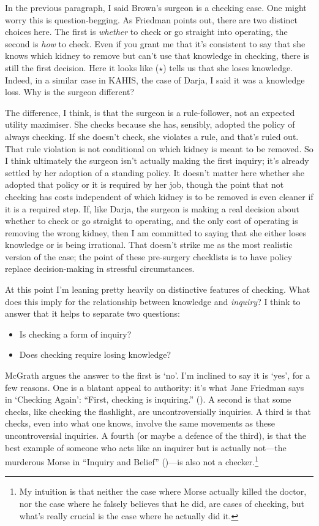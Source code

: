 \documentclass[
  11pt,
  letterpaper,
  DIV=11,
  numbers=noendperiod,
  twoside]{scrartcl}
\providecommand{\tightlist}{%
  \setlength{\itemsep}{0pt}\setlength{\parskip}{0pt}}
\begin{document}
In the previous paragraph, I said Brown's surgeon is a checking case.
One might worry this is question-begging. As Friedman points out, there
are two distinct choices here. The first is \emph{whether} to check or
go straight into operating, the second is \emph{how} to check. Even if
you grant me that it's consistent to say that she knows which kidney to
remove but can't use that knowledge in checking, there is still the
first decision. Here it looks like (\(\star\)) tells us that she loses
knowledge. Indeed, in a similar case in KAHIS, the case of Darja, I said
it was a knowledge loss. Why is the surgeon different?

The difference, I think, is that the surgeon is a rule-follower, not an
expected utility maximiser. She checks because she has, sensibly,
adopted the policy of always checking. If she doesn't check, she
violates a rule, and that's ruled out. That rule violation is not
conditional on which kidney is meant to be removed. So I think
ultimately the surgeon isn't actually making the first inquiry; it's
already settled by her adoption of a standing policy. It doesn't matter
here whether she adopted that policy or it is required by her job,
though the point that not checking has costs independent of which kidney
is to be removed is even cleaner if it is a required step. If, like
Darja, the surgeon is making a real decision about whether to check or
go straight to operating, and the only cost of operating is removing the
wrong kidney, then I am committed to saying that she either loses
knowledge or is being irrational. That doesn't strike me as the most
realistic version of the case; the point of these pre-surgery checklists
is to have policy replace decision-making in stressful circumstances.

At this point I'm leaning pretty heavily on distinctive features of
checking. What does this imply for the relationship between knowledge
and \emph{inquiry}? I think to answer that it helps to separate two
questions:

\begin{itemize}
\tightlist
\item
  Is checking a form of inquiry?
\item
  Does checking require losing knowledge?
\end{itemize}

McGrath argues the answer to the first is `no'. I'm inclined to say it
is `yes', for a few reasons. One is a blatant appeal to authority: it's
what Jane Friedman says in `Checking Again': ``First, checking is
inquiring.'' (). A
second is that some checks, like checking the flashlight, are
uncontroversially inquiries. A third is that checks, even into what one
knows, involve the same movements as these uncontroversial inquiries. A
fourth (or maybe a defence of the third), is that the best example of
someone who acts like an inquirer but is actually not---the murderous
Morse in ``Inquiry and Belief'' ()---is also not a checker.\footnote{My intuition is that neither
  the case where Morse actually killed the doctor, nor the case where he
  falsely believes that he did, are cases of checking, but what's really
  crucial is the case where he actually did it.}
\end{document}
